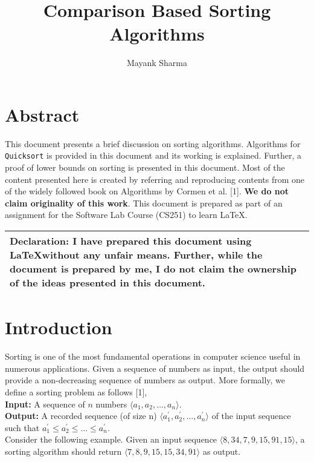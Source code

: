 \documentclass[letter,11pt,twocolumn]{article}
\title{Comparison Based Sorting Algorithms}
\author{Mayank Sharma }
\begin{document}
\date{}
\maketitle
\section*{Abstract}
This document presents a brief discussion on sorting algorithms. Algorithms for \texttt{Quicksort} is provided in this document and its working is explained.
Further, a proof of lower bounds on sorting is presented in this document. Most of the content presented here is created by referring and reproducing contents from one of the widely followed book on Algorithms by Cormen et al. [1]. \textbf{We do not claim originality of this work}. This document is prepared as part of an assignment for the Software Lab
Course (CS251) to learn \LaTeX{}.

	\vspace{1.8mm}
\begin{tabular}{|p{}|}
    \hline
    Declaration: I have prepared this document using \LaTeX without any unfair means. Further, while the document is prepared by me, I do not claim the ownership of the ideas presented in this document.
    \\\hline
\end{tabular}
\section{Introduction}

Sorting is one of the most fundamental operations in computer science useful in numerous applications. Given a sequence of numbers as input, the output should provide a non-decreasing sequence of numbers as output. More formally, we define a sorting problem as follows [1],\\
\textbf{Input:} A sequence of $n$ numbers $\langle a_1,a_2,\dots , a_n \rangle$.\\
\textbf{Output:} A recorded sequence (of size n) $\langle a_{1}^{'},a_{2}^{'},\dots,a_{n}^{'} \rangle$ of the input sequence such that $a_{1}^{'} \leq a_{2}^{'} \leq \dots \leq a_{n}^{'}$.\\
Consider the following example. Given an input sequence $\langle 8, 34, 7, 9, 15, 91, 15 \rangle$, a sorting algorithm should return $\langle 7, 8, 9, 15, 15, 34, 91\rangle$ as output.
\end{document}
